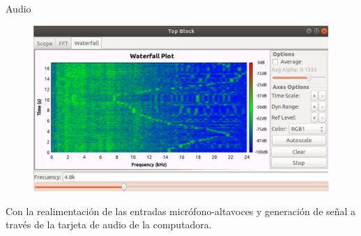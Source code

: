 \begin{frame}{Audio}

\begin{figure}
\begin{center}
\vspace{-8mm}
\includegraphics[width=\textwidth, height=0.6\paperheight]{parte1/lab3/pdf/lab3_10.pdf}
\end{center}
\end{figure}
\vspace{-5mm}
Con la realimentación de las entradas micrófono-altavoces y generación de señal a través de la tarjeta de audio de la computadora.

\end{frame}
